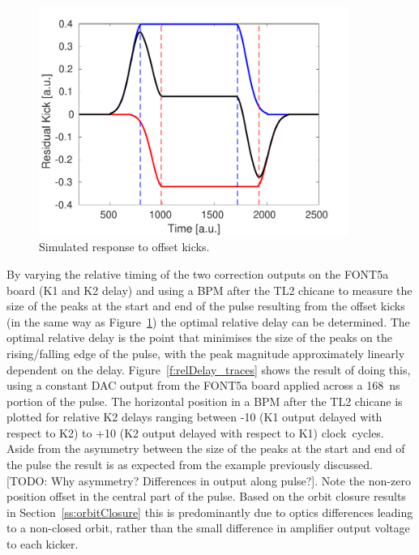 \begin{figure}
  \centering
  \includegraphics[width=0.9\textwidth]{Figures/commissioning/relDelay_sim}
  \caption{Simulated response to offset kicks.}
  \label{f:relDelay_sim}
\end{figure}

By varying the relative timing of the two correction outputs on the FONT5a board (K1 and K2 delay) and using a BPM after the TL2 chicane to measure the size of the peaks at the start and end of the pulse resulting from the offset kicks (in the same way as Figure~\ref{f:relDelay_sim}) the optimal relative delay can be determined. The optimal relative delay is the point that minimises the size of the peaks on the rising/falling edge of the pulse, with the peak magnitude  approximately linearly dependent on the delay. Figure~\ref{f:relDelay_traces} shows the result of doing this, using a constant DAC output from the FONT5a board applied across a 168~ns portion of the pulse. The horizontal position in a BPM after the TL2 chicane is plotted for relative K2 delays ranging between -10 (K1 output delayed with respect to K2) to +10 (K2 output delayed with respect to K1) clock~cycles. Aside from the asymmetry between the size of the peaks at the start and end of the pulse the result is as expected from the example previously discussed. [TODO: Why asymmetry? Differences in output along pulse?]. Note the non-zero position offset in the central part of the pulse. Based on the orbit closure results in Section~\ref{ss:orbitClosure} this is predominantly due to optics differences leading to a non-closed orbit, rather than the small difference in amplifier output voltage to each kicker.

